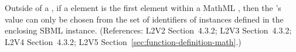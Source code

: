 Outside of a \FunctionDefinition, if a  element is the
first element within a MathML , then the 's
value can only be chosen from the set of identifiers of
\FunctionDefinition{} instances defined in the
enclosing SBML \Model instance.
(References: L2V2 Section~4.3.2; L2V3 Section~4.3.2; L2V4 Section~4.3.2; L2V5 
Section~\ref{sec:function-definition-math}.)
